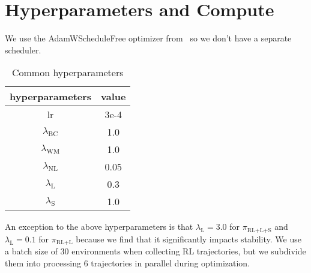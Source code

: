 
\section{Hyperparameters and Compute}
\label{app:compute}

We use the AdamWScheduleFree optimizer from~\citet{defazio2024schedulefree} so we don't have a separate scheduler.

\begin{table}[H]
\centering
\caption{Common hyperparameters}
\vskip 0.15in
\begin{tabular}{cc}
\toprule
hyperparameters & value \\
\midrule
lr & 3e-4 \\
$\lambda_\text{BC}$ &  1.0\\
$\lambda_\text{WM}$ &  1.0\\
$\lambda_\text{NL}$ &  0.05\\
$\lambda_\text{L}$ &  0.3\\
$\lambda_\text{S}$ &  1.0\\
\bottomrule
\end{tabular}
\vskip -0.1in
\end{table}

An exception to the above hyperparameters is that $\lambda_\text{L}=3.0$ for $\pi_\text{RL+L+S}$ and $\lambda_\text{L}=0.1$ for $\pi_\text{RL+L}$ because we find that it significantly impacts stability. We use a batch size of 30 environments when collecting RL trajectories, but we subdivide them into processing 6 trajectories in parallel during optimization.


